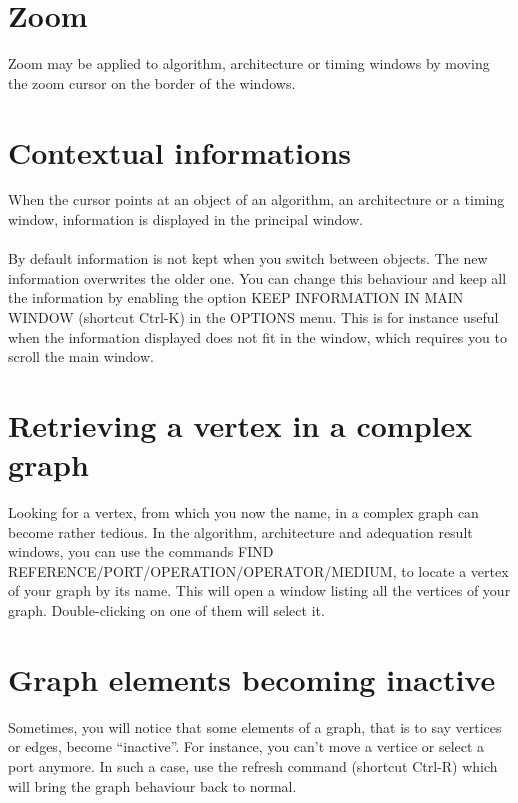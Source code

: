 \documentclass[11pt,twoside]{report}
\begin{document}
\section{Zoom}
Zoom may be applied to algorithm, architecture or timing windows by
moving the zoom cursor on the border of the windows.

\section{Contextual informations}
When the cursor points at an object of an algorithm, an architecture
or a timing window, information is displayed in the principal window.\\\\
By default information is not kept when you switch between objects.
The new information overwrites the older one. You can change this
behaviour and keep all the information by enabling the option KEEP
INFORMATION IN MAIN WINDOW (shortcut Ctrl-K) in the OPTIONS menu. This
is for instance useful when the information displayed does not fit in
the window, which requires you to scroll the main window.

\section{Retrieving a vertex in a complex graph}
Looking for a vertex, from which you now the name, in a complex graph
can become rather tedious. In the algorithm, architecture and
adequation result windows, you can use the commands FIND
REFERENCE/PORT/OPERATION/OPERATOR/MEDIUM, to locate a vertex of your
graph by its name. This will open a window listing all the vertices of
your graph. Double-clicking on one of them will select it.

\section{Graph elements becoming inactive}
Sometimes, you will notice that some elements of a graph, that is to
say vertices or edges, become ``inactive''. For instance, you can't
move a vertice or select a port anymore. In such a case, use the
refresh command (shortcut Ctrl-R) which will bring the graph behaviour
back to normal.
\end{document}
